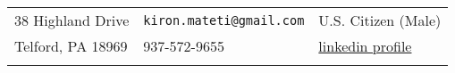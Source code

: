 \begin{tabular} {L{2in}  L{2.5in} L{2in}}
38 Highland Drive & {\tt  kiron.mateti@gmail.com} & U.S. Citizen (Male) \\
Telford, PA 18969 & 937-572-9655 & \href{http://www.linkedin.com/in/kiron-mateti-b691152}{linkedin profile}
\\ \\
\end{tabular}